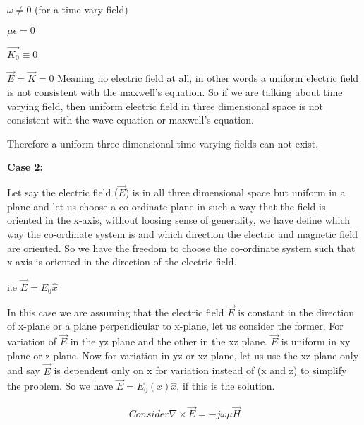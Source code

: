 		$\omega\neq0$ (for a time vary field)
		
		\bigskip
		
		$\mu\epsilon=0$
		
		
		
		
		\bigskip
		
		$\vec{K_{0}}\equiv0$
		
		\bigskip
		
		$\vec{E}=\vec{K}=0$ Meaning no electric field at all, in other words a uniform electric field is not consistent with the maxwell's equation. So if we are talking about time varying field, then uniform electric field in three dimensional space is not consistent with the wave equation or maxwell's equation.
		
		\bigskip
		
		Therefore a uniform three dimensional time varying fields can not exist.
		
		\bigskip
		
		\textbf{Case 2:}
		
		\bigskip
		
		Let say the electric field ($\vec{E}$) is in all three dimensional space but uniform in a plane and let us choose a co-ordinate plane in such a way that the field is oriented in the x-axis, without loosing sense of generality, we have define which way the co-ordinate system is and which direction the electric and magnetic field are oriented. So we have the freedom to choose the co-ordinate system such that x-axis is oriented in the direction of the electric field.
		
		\bigskip
		
		i.e $\vec{E}={E_{0}}\hat{x}$
		
		\bigskip
		
		In this case we are assuming that the electric field $\vec{E}$ is constant in the direction of x-plane or a plane perpendicular to x-plane, let us consider the former. For variation of $\vec{E}$ in the yz plane and the other in the xz plane. $\vec{E}$ is uniform in xy plane or z plane. Now for variation in yz or xz plane, let us use the xz plane only and say $\vec{E}$ is dependent only on x for variation instead of (x and z) to simplify the problem. So we have $\vec{E}={E_{0}(x)}\hat{x}$, if this is the solution.
		
		
		\bigskip
		\begin{align}
		Consider \nabla\times\vec{E}=-j\omega\mu\vec{H}
		\end{align}
	
		\bigskip
		

